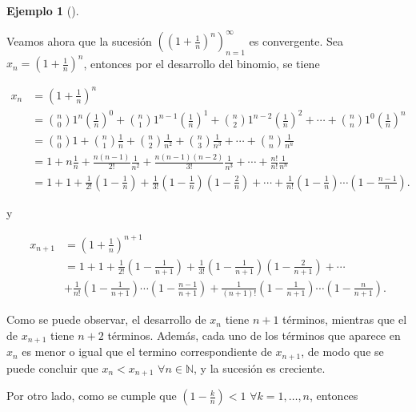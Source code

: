 \documentclass[
  a4paper,
]{scrreport}
\theoremstyle{definition}
\newtheorem{example}{Ejemplo}[chapter]
\theoremstyle{plain}
\theoremstyle{definition}
\theoremstyle{plain}
\theoremstyle{plain}
\theoremstyle{remark}
\begin{document}
\leavevmode{}%
\begin{example}[]\label{exm-sucesiones-monotonas-convergentes-3}

Veamos ahora que la sucesión
\(\left(\left(1+\frac{1}{n}\right)^n\right)_{n=1}^\infty\) es
convergente. Sea \(x_n=\left(1+\frac{1}{n}\right)^n\), entonces por el
desarrollo del binomio, se tiene

\begin{align*}
x_n &= \left(1+\frac{1}{n}\right)^n \\
&= \binom{n}{0}1^n\left(\frac{1}{n}\right)^0+\binom{n}{1}1^{n-1}\left(\frac{1}{n}\right)^1 +  \binom{n}{2}1^{n-2}\left(\frac{1}{n}\right)^2 +\cdots + \binom{n}{n}1^0\left(\frac{1}{n}\right)^n \\ 
& = \binom{n}{0}1+\binom{n}{1}\frac{1}{n} + \binom{n}{2}\frac{1}{n^2} + \binom{n}{3}\frac{1}{n^3} +\cdots + \binom{n}{n}\frac{1}{n^n} \\ 
& = 1+n\frac{1}{n} + \frac{n(n-1)}{2!}\frac{1}{n^2} + \frac{n(n-1)(n-2)}{3!}\frac{1}{n^3} +\cdots + \frac{n!}{n!}\frac{1}{n^n} \\ 
&= 1 + 1 + \frac{1}{2!}\left(1-\frac{1}{n}\right) + \frac{1}{3!}\left(1-\frac{1}{n}\right)\left(1-\frac{2}{n}\right) + \cdots + \frac{1}{n!}\left(1-\frac{1}{n}\right)\cdots \left(1-\frac{n-1}{n}\right).
\end{align*}

y

\begin{align*}
x_{n+1} &= \left(1+\frac{1}{n}\right)^{n+1} \\
&= 1 + 1 + \frac{1}{2!}\left(1-\frac{1}{n+1}\right) + \frac{1}{3!}\left(1-\frac{1}{n+1}\right)\left(1-\frac{2}{n+1}\right) + \cdots  \\
&+ \frac{1}{n!}\left(1-\frac{1}{n+1}\right)\cdots \left(1-\frac{n-1}{n+1}\right) + \frac{1}{(n+1)!}\left(1-\frac{1}{n+1}\right)\cdots \left(1-\frac{n}{n+1}\right).
\end{align*}

Como se puede observar, el desarrollo de \(x_n\) tiene \(n+1\) términos,
mientras que el de \(x_{n+1}\) tiene \(n+2\) términos. Además, cada uno
de los términos que aparece en \(x_n\) es menor o igual que el termino
correspondiente de \(x_{n+1}\), de modo que se puede concluir que
\(x_n<x_{n+1}\) \(\forall n\in\mathbb{N}\), y la sucesión es creciente.

Por otro lado, como se cumple que \(\left(1-\frac{k}{n}\right)<1\)
\(\forall k=1,\ldots,n\), entonces


\end{example}
\end{document}

